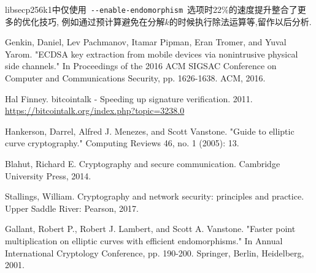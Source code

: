 \documentclass{article}
\newcommand{\code}[1]{\lstinline!#1!}
\begin{document}


libsecp256k1中仅使用~\code{--enable-endomorphism}~选项时22\%的速度提升整合了更多的优化技巧,
例如通过预计算避免在分解$k$的时候执行除法运算等,留作以后分析.

\begin{thebibliography}{99}

Genkin, Daniel, Lev Pachmanov, Itamar Pipman, Eran Tromer, and Yuval Yarom. "ECDSA key extraction from mobile devices via nonintrusive physical side channels." In Proceedings of the 2016 ACM SIGSAC Conference on Computer and Communications Security, pp. 1626-1638. ACM, 2016.

Hal Finney. bitcointalk - Speeding up signature verification. 2011.
\url{https://bitcointalk.org/index.php?topic=3238.0}

Hankerson, Darrel, Alfred J. Menezes, and Scott Vanstone. "Guide to elliptic curve cryptography." Computing Reviews 46, no. 1 (2005): 13.

Blahut, Richard E. Cryptography and secure communication. Cambridge University Press, 2014.

Stallings, William. Cryptography and network security: principles and practice. Upper Saddle River: Pearson, 2017.

Gallant, Robert P., Robert J. Lambert, and Scott A. Vanstone. "Faster point multiplication on elliptic curves with efficient endomorphisms." In Annual International Cryptology Conference, pp. 190-200. Springer, Berlin, Heidelberg, 2001.

\end{thebibliography}
\end{document}
